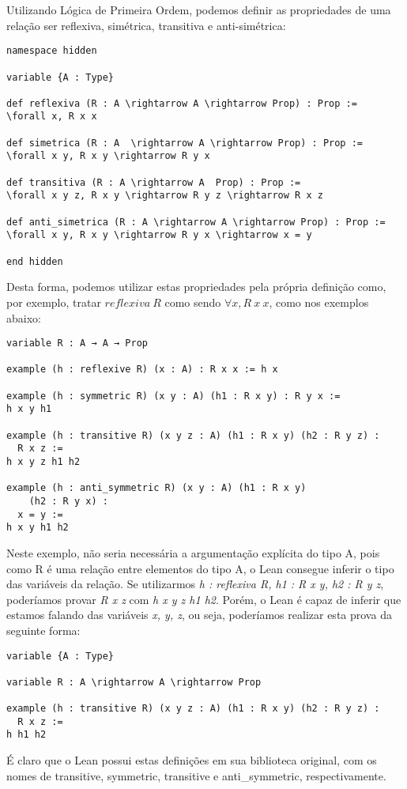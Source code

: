 Utilizando Lógica de Primeira Ordem, podemos definir as propriedades de uma relação ser reflexiva, simétrica, transitiva e anti-simétrica:
\begin{lstlisting}
namespace hidden

variable {A : Type}

def reflexiva (R : A \rightarrow A \rightarrow Prop) : Prop :=
\forall x, R x x

def simetrica (R : A  \rightarrow A \rightarrow Prop) : Prop :=
\forall x y, R x y \rightarrow R y x

def transitiva (R : A \rightarrow A  Prop) : Prop :=
\forall x y z, R x y \rightarrow R y z \rightarrow R x z

def anti_simetrica (R : A \rightarrow A \rightarrow Prop) : Prop :=
\forall x y, R x y \rightarrow R y x \rightarrow x = y

end hidden
\end{lstlisting}
Desta forma, podemos utilizar estas propriedades pela própria definição como, por exemplo, tratar $reflexiva \ R$ como sendo $\forall x, R \ x \ x$, como nos exemplos abaixo:
\begin{lstlisting}
variable R : A → A → Prop

example (h : reflexive R) (x : A) : R x x := h x

example (h : symmetric R) (x y : A) (h1 : R x y) : R y x :=
h x y h1

example (h : transitive R) (x y z : A) (h1 : R x y) (h2 : R y z) :
  R x z :=
h x y z h1 h2

example (h : anti_symmetric R) (x y : A) (h1 : R x y)
    (h2 : R y x) :
  x = y :=
h x y h1 h2
\end{lstlisting}
Neste exemplo, não seria necessária a argumentação explícita do tipo A, pois como R é uma relação entre elementos do tipo A, o Lean consegue inferir o tipo das variáveis da relação.
Se utilizarmos \textit{h : reflexiva R, h1 : R x y, h2 : R y z}, poderíamos provar \textit{R x z} com \textit{h x y z h1 h2}.
Porém, o Lean é capaz de inferir que estamos falando das variáveis \textit{x, y, z}, ou seja, poderíamos realizar esta prova da seguinte forma:
\begin{lstlisting}
variable {A : Type}

variable R : A \rightarrow A \rightarrow Prop

example (h : transitive R) (x y z : A) (h1 : R x y) (h2 : R y z) :
  R x z :=
h h1 h2
\end{lstlisting}
É claro que o Lean possui estas definições em sua biblioteca original, com os nomes de transitive, symmetric, transitive e anti\_symmetric, respectivamente.
